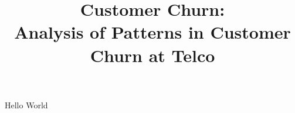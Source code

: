 \documentclass[a4paper,man,english]{apa}
\title{Customer Churn:\\Analysis of Patterns in Customer Churn at Telco}
\begin{document}
  \maketitle
  Hello World
\end{document}
